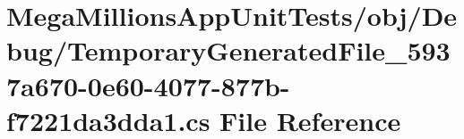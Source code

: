 \hypertarget{nit_tests_2obj_2_debug_2_temporary_generated_file__5937a670-0e60-4077-877b-f7221da3dda1_8cs}{}\section{Mega\+Millions\+App\+Unit\+Tests/obj/\+Debug/\+Temporary\+Generated\+File\+\_\+5937a670-\/0e60-\/4077-\/877b-\/f7221da3dda1.cs File Reference}
\label{nit_tests_2obj_2_debug_2_temporary_generated_file__5937a670-0e60-4077-877b-f7221da3dda1_8cs}
